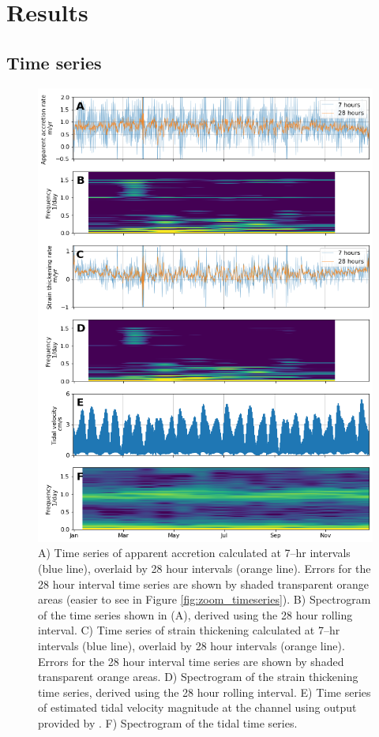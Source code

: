 \section{Results } \label{sec:apres_results}

\subsection{Time series}

\begin{figure}[!ht]
\centering
\includegraphics[width=0.85
\textwidth]{chapters/3/alltimeseries.png}
\caption[Time series]{A) Time series of apparent accretion calculated at 7--hr intervals (blue line), overlaid by 28 hour intervals (orange line). Errors for the 28 hour interval time series are shown by shaded transparent orange areas (easier to see in Figure \ref{fig:zoom_timeseries}). B) Spectrogram of the time series shown in (A), derived using the 28 hour rolling interval. C) Time series of strain thickening calculated at 7--hr intervals (blue line), overlaid by 28 hour intervals (orange line). Errors for the 28 hour interval time series are shown by shaded transparent orange areas. D)  Spectrogram of the strain thickening time series, derived using the 28 hour rolling interval. E) Time series of estimated tidal velocity magnitude at the channel using output provided by \cite{padman2002new}. F) Spectrogram of the tidal time series.
}
\label{fig:alltimeseries}
\end{figure}



